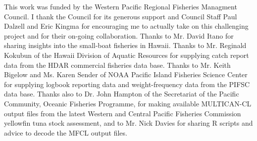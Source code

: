 \documentclass[12pt,letterpaper,twoside]{article}
\begin{document}
%
%

\vspace{4ex}
{}
This work was funded by the Western Pacific Regional Fisheries
Managment Council. I thank the Council for its generous support and
Council Staff Paul Dalzell and Eric Kingma for encouraging me to
actually take on this challenging project and for their on-going
collaboration.
Thanks to Mr. David Itano for sharing insights into the small-boat
fisheries in Hawaii.
Thanks to Mr. Reginald Kokubun of the Hawaii Division of Aquatic
Resources for supplying catch report data from the HDAR commercial
fisheries data base.
Thanks to Mr. Keith Bigelow and Ms. Karen Sender of NOAA Pacific
Island Fisheries Science Center for supplying logbook reporting data and
weight-frequency data from the PIFSC data base.
Thanks also to Dr. John Hampton of the Secretariat of the Pacific
Community, Oceanic Fisheries Programme, for making available
MULTICAN-CL output files from the latest Western and Central Pacific
Fisheries Commission yellowfin tuna stock assessment, and to Mr. Nick
Davies for sharing R scripts and advice to decode the MFCL output files.
\end{document}
